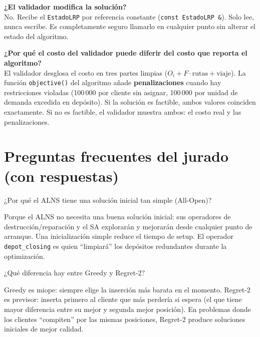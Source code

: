 \documentclass[12pt,a4paper]{article}
\begin{document}
\begin{pregunta}
\textbf{¿El validador modifica la solución?} \\
No. Recibe el \texttt{EstadoLRP} por referencia constante (\texttt{const EstadoLRP \&}). Solo lee, nunca escribe. Es completamente seguro llamarlo en cualquier punto sin alterar el estado del algoritmo.
\end{pregunta}

\begin{pregunta}
\textbf{¿Por qué el costo del validador puede diferir del costo que reporta el algoritmo?} \\
El validador desglosa el costo en tres partes limpias ($O_i + F \cdot \text{rutas} + \text{viaje}$). La función \texttt{objective()} del algoritmo añade \textbf{penalizaciones} cuando hay restricciones violadas (100\,000 por cliente sin asignar, 100\,000 por unidad de demanda excedida en depósito). Si la solución es factible, ambos valores coinciden exactamente. Si no es factible, el validador muestra ambos: el costo real y las penalizaciones.
\end{pregunta}

\section{Preguntas frecuentes del jurado (con respuestas)}

\begin{pregunta}
¿Por qué el ALNS tiene una solución inicial tan simple (All-Open)?
\end{pregunta}
Porque el ALNS no necesita una buena solución inicial: sus operadores de destrucción/reparación y el SA explorarán y mejorarán desde cualquier punto de arranque. Una inicialización simple reduce el tiempo de setup. El operador \texttt{depot\_closing} es quien ``limpiará'' los depósitos redundantes durante la optimización.

\begin{pregunta}
¿Qué diferencia hay entre Greedy y Regret-2?
\end{pregunta}
Greedy es miope: siempre elige la inserción más barata en el momento. Regret-2 es previsor: inserta primero al cliente que más perdería si espera (el que tiene mayor diferencia entre su mejor y segunda mejor posición). En problemas donde los clientes ``compiten'' por las mismas posiciones, Regret-2 produce soluciones iniciales de mejor calidad.
\end{document}

